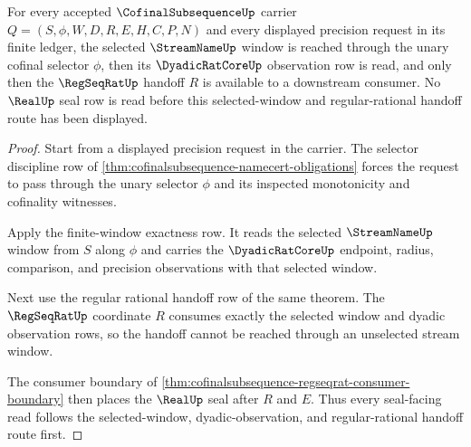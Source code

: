 \begin{theorem}
\label{thm:cofinalsubsequence-window-handoff-exactness}
For every accepted $\CofinalSubsequenceUp$ carrier $Q=(S,\phi,W,D,R,E,H,C,P,N)$ and every displayed precision request in its finite ledger, the selected $\StreamNameUp$ window is reached through the unary cofinal selector $\phi$, then its $\DyadicRatCoreUp$ observation row is read, and only then the $\RegSeqRatUp$ handoff $R$ is available to a downstream consumer. No $\RealUp$ seal row is read before this selected-window and regular-rational handoff route has been displayed.
\end{theorem}
\begin{proof}
Start from a displayed precision request in the carrier. The selector discipline row of \autoref{thm:cofinalsubsequence-namecert-obligations} forces the request to pass through the unary selector $\phi$ and its inspected monotonicity and cofinality witnesses.

Apply the finite-window exactness row. It reads the selected $\StreamNameUp$ window from $S$ along $\phi$ and carries the $\DyadicRatCoreUp$ endpoint, radius, comparison, and precision observations with that selected window.

Next use the regular rational handoff row of the same theorem. The $\RegSeqRatUp$ coordinate $R$ consumes exactly the selected window and dyadic observation rows, so the handoff cannot be reached through an unselected stream window.

The consumer boundary of \autoref{thm:cofinalsubsequence-regseqrat-consumer-boundary} then places the $\RealUp$ seal after $R$ and $E$. Thus every seal-facing read follows the selected-window, dyadic-observation, and regular-rational handoff route first.
\end{proof}

